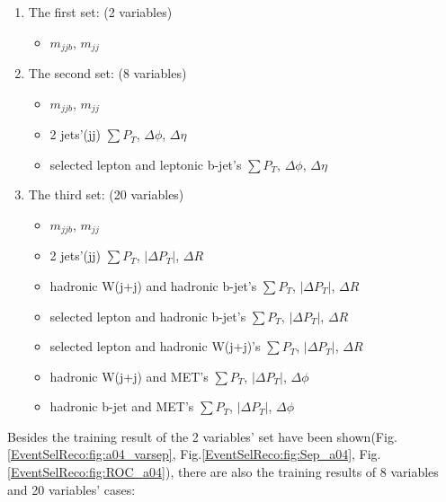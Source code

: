 			\begin{enumerate}
			\item The first set: (2 variables)
				\begin{itemize}
				\item $m_{jjb}$, $m_{jj}$
				\end{itemize}

			\item The second set: (8 variables)
				\begin{itemize}
				\item $m_{jjb}$, $m_{jj}$
				\item 2 jets'(jj) $\sum P_{T}$, $\Delta \phi$, $\Delta \eta$
				\item selected lepton and leptonic b-jet's $\sum P_{T}$, $\Delta \phi$, $\Delta \eta$ 
				\end{itemize}

			\item The third set: (20 variables)
				\begin{itemize}
				\item $m_{jjb}$, $m_{jj}$
				\item 2 jets'(jj) $\sum P_{T}$, $|\Delta P_{T}|$, $\Delta R$
				\item hadronic W(j+j) and hadronic b-jet's $\sum P_{T}$, $|\Delta P_{T}|$, $\Delta R$
				\item selected lepton and hadronic b-jet's $\sum P_{T}$, $|\Delta P_{T}|$, $\Delta R$
				\item selected lepton and hadronic W(j+j)'s $\sum P_{T}$, $|\Delta P_{T}|$, $\Delta R$
				\item hadronic W(j+j) and MET's $\sum P_{T}$, $|\Delta P_{T}|$, $\Delta \phi$
				\item hadronic b-jet and MET's $\sum P_{T}$, $|\Delta P_{T}|$, $\Delta \phi$
				\end{itemize}
			\label{EventSelReco:itm:mva_var}
			\end{enumerate}

			Besides the training result of the 2 variables' set have been shown(Fig.\ref{EventSelReco:fig:a04_varsep}, Fig.\ref{EventSelReco:fig:Sep_a04}, Fig.\ref{EventSelReco:fig:ROC_a04}), there are also the training results of 8 variables and 20 variables' cases:

